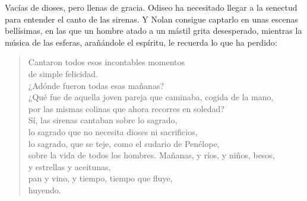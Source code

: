 Vacías de dioses, pero llenas de gracia. Odiseo ha necesitado llegar a la senectud para entender el canto de las sirenas. Y Nolan consigue captarlo en unas escenas bellísimas, en las que un hombre atado a un mástil grita desesperado, mientras la música de las esferas, arañándole el espíritu, le recuerda lo que ha perdido:

\begin{verse}
Cantaron todos esos incontables momentos\\
de simple felicidad.\\
¿Adónde fueron todas esas mañanas?\\
¿Qué fue de aquella joven pareja que caminaba, cogida de la mano,\\
por las mismas colinas que ahora recorres en soledad?\\
Sí, las sirenas cantaban sobre lo sagrado,\\
lo sagrado que no necesita dioses ni sacrificios,\\
lo sagrado, que se teje, como el sudario de Penélope,\\
sobre la vida de todos los hombres. Mañanas, y ríos, y niños, besos,\\
y estrellas y aceitunas,\\
pan y vino, y tiempo, tiempo que fluye,\\
huyendo.
\end{verse}
